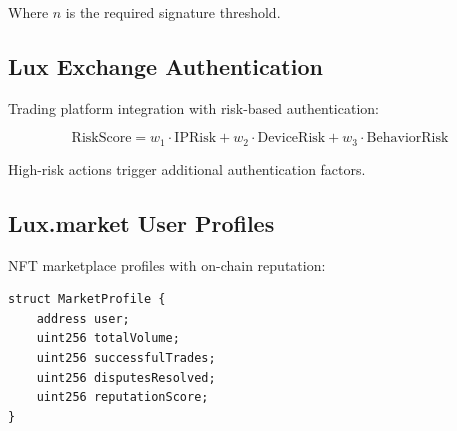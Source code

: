 Where $n$ is the required signature threshold.

\subsection{Lux Exchange Authentication}

Trading platform integration with risk-based authentication:

\begin{equation}
    \text{RiskScore} = w_1 \cdot \text{IPRisk} + w_2 \cdot \text{DeviceRisk} + w_3 \cdot \text{BehaviorRisk}
\end{equation}

High-risk actions trigger additional authentication factors.

\subsection{Lux.market User Profiles}

NFT marketplace profiles with on-chain reputation:

\begin{lstlisting}[language=Solidity]
struct MarketProfile {
    address user;
    uint256 totalVolume;
    uint256 successfulTrades;
    uint256 disputesResolved;
    uint256 reputationScore;
}
\end{lstlisting}

